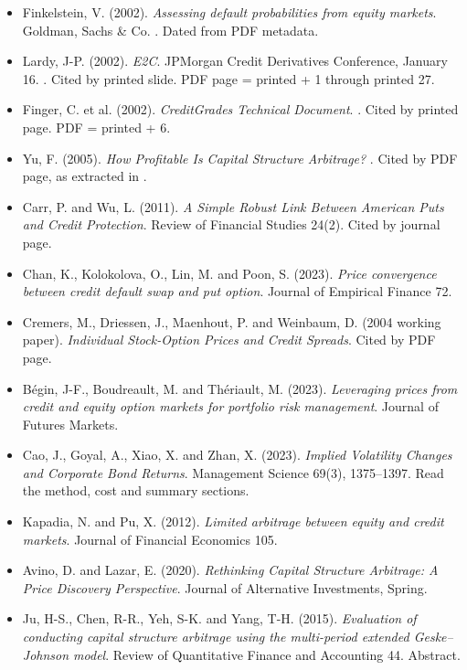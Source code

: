 \documentclass[10pt,a4paper]{article}
\begin{document}
\footnotesize
\begin{itemize}[nosep]
\item Finkelstein, V. (2002). \emph{Assessing default probabilities from equity markets}. Goldman, Sachs \& Co. . Dated from PDF metadata.
\item Lardy, J-P. (2002). \emph{E2C}. JPMorgan Credit Derivatives Conference, January 16. . Cited by printed slide. PDF page = printed + 1 through printed 27.
\item Finger, C. et al. (2002). \emph{CreditGrades Technical Document}. . Cited by printed page. PDF = printed + 6.
\item Yu, F. (2005). \emph{How Profitable Is Capital Structure Arbitrage?} . Cited by PDF page, as extracted in .
\item Carr, P. and Wu, L. (2011). \emph{A Simple Robust Link Between American Puts and Credit Protection}. Review of Financial Studies 24(2). Cited by journal page.
\item Chan, K., Kolokolova, O., Lin, M. and Poon, S. (2023). \emph{Price convergence between credit default swap and put option}. Journal of Empirical Finance 72.
\item Cremers, M., Driessen, J., Maenhout, P. and Weinbaum, D. (2004 working paper). \emph{Individual Stock-Option Prices and Credit Spreads}. Cited by PDF page.
\item B\'egin, J-F., Boudreault, M. and Th\'eriault, M. (2023). \emph{Leveraging prices from credit and equity option markets for portfolio risk management}. Journal of Futures Markets.
\item Cao, J., Goyal, A., Xiao, X. and Zhan, X. (2023). \emph{Implied Volatility Changes and Corporate Bond Returns}. Management Science 69(3), 1375--1397. Read the method, cost and summary sections.
\item Kapadia, N. and Pu, X. (2012). \emph{Limited arbitrage between equity and credit markets}. Journal of Financial Economics 105.
\item Avino, D. and Lazar, E. (2020). \emph{Rethinking Capital Structure Arbitrage: A Price Discovery Perspective}. Journal of Alternative Investments, Spring.
\item Ju, H-S., Chen, R-R., Yeh, S-K. and Yang, T-H. (2015). \emph{Evaluation of conducting capital structure arbitrage using the multi-period extended Geske--Johnson model}. Review of Quantitative Finance and Accounting 44. Abstract.

\end{itemize}
\end{document}

